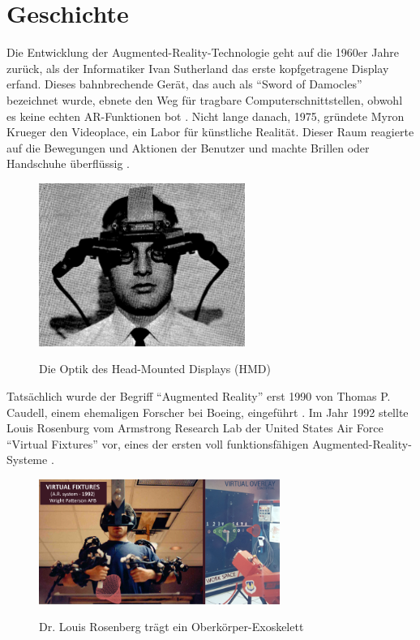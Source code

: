 
\section{Geschichte}

Die Entwicklung der Augmented-Reality-Technologie geht auf die 1960er Jahre zurück, als der Informatiker Ivan Sutherland das erste kopfgetragene Display erfand. Dieses bahnbrechende Gerät, das auch als “Sword of Damocles” bezeichnet wurde, ebnete den Weg für tragbare Computerschnittstellen, obwohl es keine echten AR-Funktionen bot \cite{Sutherland1968AHT}. Nicht lange danach, 1975, gründete Myron Krueger den Videoplace, ein Labor für künstliche Realität. Dieser Raum reagierte auf die Bewegungen und Aktionen der Benutzer und machte Brillen oder Handschuhe überflüssig \cite{Videoplace}.

\vspace{1cm}

\begin{figure}[ht!]
    \centering
    \includegraphics[width=0.6\textwidth]{attachments/Sutherland_1.png}
    \caption{Die Optik des Head-Mounted Displays (HMD)} \cite{Sutherland1968AHT}
\end{figure}


Tatsächlich wurde der Begriff “Augmented Reality” erst 1990 von Thomas P. Caudell, einem ehemaligen Forscher bei Boeing, eingeführt \cite{Lee2012AugmentedRI}. Im Jahr 1992 stellte Louis Rosenburg vom Armstrong Research Lab der United States Air Force “Virtual Fixtures” vor, eines der ersten voll funktionsfähigen Augmented-Reality-Systeme \cite{rosenberg1992use}.

\begin{figure}[ht!]
    \centering
    \includegraphics[width=0.7\textwidth]{attachments/Rosenburg.jpg}
    \caption{Dr. Louis Rosenberg trägt ein Oberkörper-Exoskelett} \cite{rosenberg1992use}
\end{figure}


